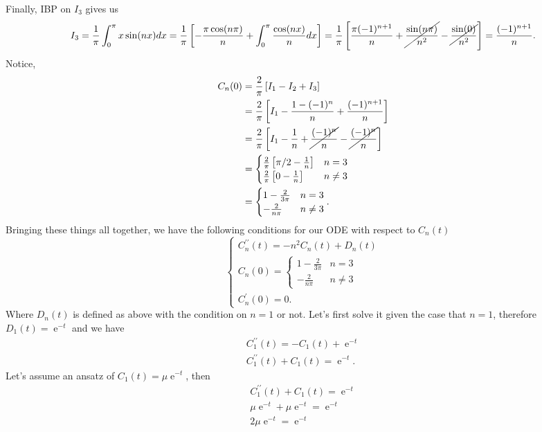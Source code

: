 \documentclass[10pt]{amsart}
\DeclareMathOperator{\E}{e}
\theoremstyle{nonumberplain}
\begin{document}
\begin{enumerate}[label={\bf {\arabic*}:}]
$$$$
Finally, IBP on $I_3$ gives us
$$
I_3 = \frac 1 \pi \int_0^\pi  x \sin(nx) dx
	= \frac 1 \pi \left[ -\frac{\pi \cos (n\pi)} n + \int_0^\pi \frac {\cos(nx)} n dx \right]
	= \frac 1 \pi \left[ \frac{\pi (-1)^{n + 1}} n + \cancel{\frac {\sin(n\pi)} {n^2}} - \cancel{\frac {\sin(0)} {n^2}} \right]
	= \frac{(-1)^{n + 1}} n.
$$
Notice,
\begin{align*}
C_n(0) &= \frac 2 \pi \left[ I_1 - I_2 + I_3 \right] \\
	&= \frac 2 \pi \left[ I_1 - \frac {1 - (-1)^n} n + \frac{(-1)^{n + 1}} n \right] \\
	&= \frac 2 \pi \left[ I_1 - \frac 1 n + \cancel{\frac{ (-1)^n} n} - \cancel{\frac{(-1)^{n}} n} \right] \\
	&= \begin{cases} \frac 2 \pi \left[ \pi / 2 - \frac 1 n \right] & n = 3\\
		\frac 2 \pi \left[ 0 - \frac 1 n \right] & n \neq 3 \end{cases} \\
	&= \begin{cases} 1 - \frac 2 {3 \pi} & n = 3\\
		- \frac 2 {n \pi} & n \neq 3 \end{cases}.
\end{align*}
Bringing these things all together, we have the following conditions for our ODE with respect to $C_n(t)$
$$
\begin{cases}
C_n^{\prime\prime}(t) = -n^2 C_n(t) + D_n(t) \\
C_n(0) = \begin{cases} 1 - \frac 2 {3 \pi} & n = 3\\
		- \frac 2 {n \pi} & n \neq 3 \end{cases} \\
C_n^\prime(0) = 0.
\end{cases}
$$
Where $D_n(t)$ is defined as above with the condition on $n=1$ or not.
Let's first solve it given the case that $n = 1$, therefore $D_1(t) = \E^{-t}$ and we have
\begin{align*}
C_1^{\prime\prime}(t) = - C_1(t) + \E^{-t} \\
C_1^{\prime\prime}(t) + C_1(t) = \E^{-t}.
\end{align*}
Let's assume an ansatz of $C_1(t) = \mu\E^{-t}$, then
\begin{align*}
C_1^{\prime\prime}(t) + C_1(t) = \E^{-t} \\
\mu\E^{-t} + \mu\E^{-t} = \E^{-t} \\
2\mu\E^{-t} = \E^{-t} \\

\end{align*}
\end{enumerate}
\end{document}
